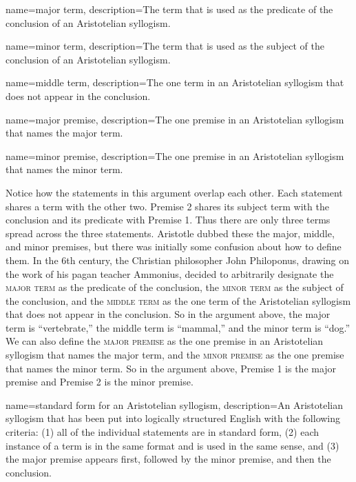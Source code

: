 {
name=major term,
description={The term that is used as the predicate of the conclusion of an Aristotelian syllogism.}
}

{
name=minor term,
description={The term that is used as the subject of the conclusion of an Aristotelian syllogism.}
}

{
name=middle term,
description={The one term in an Aristotelian syllogism that does not appear in the conclusion.}
}

{
name=major premise,
description={The one premise in an Aristotelian syllogism that names the major term.}
}

{
name=minor premise,
description={The one premise in an Aristotelian syllogism that names the minor term.}
}

Notice how the statements in this argument overlap each other. Each statement shares a term with the other two. Premise 2 shares its subject term with the conclusion and its predicate with Premise 1. Thus there are only three terms spread across the three statements. Aristotle dubbed these the major, middle, and minor premises, but there was initially some confusion about how to define them. In the 6th century, the Christian philosopher John Philoponus, drawing on the work of his pagan teacher Ammonius, decided to arbitrarily designate the \textsc{\gls{major term}} as the predicate of the conclusion, the \textsc{\gls{minor term}} as the subject of the conclusion, and the \textsc{\gls{middle term}} as the one term of the Aristotelian syllogism that does not appear in the conclusion. So in the argument above, the major term is ``vertebrate,'' the middle term is ``mammal,'' and the minor term is ``dog.'' We can also define the \textsc{\gls{major premise}} as the one premise in an Aristotelian syllogism that names the major term, and the \textsc{\gls{minor premise}} as the one premise that names the minor term. So in the argument above, Premise 1 is the major premise and Premise 2 is the minor premise. 

{
name=standard form for an Aristotelian syllogism,
description={An Aristotelian syllogism that has been put into logically structured English with the following criteria: (1) all of the individual statements are in standard form, (2) each instance of a term is in the same format and is used in the same sense, and (3) the major premise appears first, followed by the minor premise, and then the conclusion.}
} 

